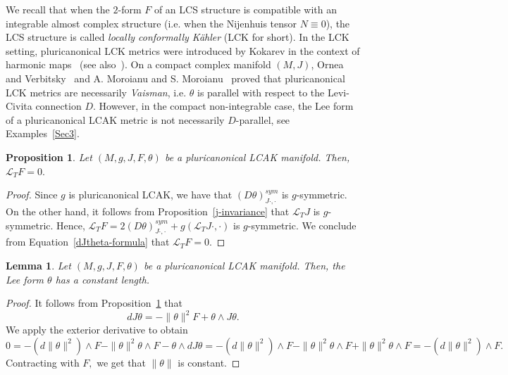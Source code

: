 \documentclass[a4paper,11pt]{amsart}
\newtheorem{prop}[thm]{Proposition}
\newtheorem{lem}[thm]{Lemma}
\theoremstyle{definition}
\renewcommand{\[}{\begin{equation*}}
\renewcommand{\]}{\end{equation*}}
\begin{document}
We recall that when the $2$-form $F$ of an LCS structure is compatible with an integrable almost complex structure (i.e. when the Nijenhuis tensor $N\equiv 0$), the LCS structure is called {\it locally conformally K\"ahler} (LCK for short). In the LCK setting, pluricanonical LCK metrics were introduced by Kokarev in the context of harmonic maps~\cite{MR2520354} (see also~\cite{MR2566566}). On a compact complex manifold $(M,J)$, Ornea and Verbitsky~\cite{MR4771164} and A. Moroianu and S. Moroianu~\cite{MR3674175} proved that pluricanonical LCK metrics are necessarily {\it Vaisman}, i.e. $\theta$ is parallel with respect to the Levi-Civita connection $D$. However, in the compact non-integrable case, the Lee form of a pluricanonical LCAK metric is not necessarily $D$-parallel, see Examples~\ref{Sec3}.


 

 \begin{prop}\label{lee-symplectomorphism}
Let $(M, g, J, F, \theta)$ be a pluricanonical LCAK manifold. Then, $\mathcal{L}_TF=0.$
 \end{prop}
 \begin{proof}
 Since $g$ is pluricanonical LCAK, we have that $\left(D\theta\right)^{sym}_{J\cdot,\cdot}$ is $g$-symmetric. On the other hand,
 it follows from Proposition~\ref{j-invariance} that $\mathcal{L}_TJ$ is $g$-symmetric. Hence, $\mathcal{L}_TF=2\left(D\theta\right)^{sym}_{J\cdot,\cdot}+g(\mathcal{L}_TJ\cdot,\cdot)$ is $g$-symmetric. We conclude from Equation~\ref{dJtheta-formula} that $\mathcal{L}_TF=0.$
 \end{proof}
  \begin{lem}\label{constant-length}\cite{MR4771164}
Let $(M, g, J, F, \theta)$ be a pluricanonical LCAK manifold. Then, the Lee form $\theta$ has a constant length.
 \end{lem}
 \begin{proof}
 It follows from Proposition~\ref{lee-symplectomorphism} that $$dJ\theta=-\|\theta\|^2F+\theta\wedge J\theta.$$
 We apply the exterior derivative to obtain 
\begin{equation*}
0=-\left(d\|\theta\|^2\right)\wedge F-\|\theta\|^2\theta\wedge F-\theta\wedge dJ\theta=-\left(d\|\theta\|^2\right)\wedge F-\|\theta\|^2\theta\wedge F+\|\theta\|^2\theta\wedge F=-\left(d\|\theta\|^2\right)\wedge F.
\end{equation*}
Contracting with $F,$ we get that $\|\theta\|$ is constant.
 \end{proof}
 
\end{document}
